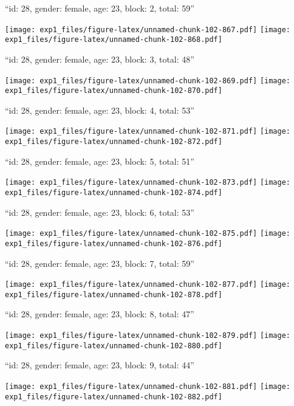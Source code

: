 \documentclass[11pt,,]{article}
\begin{document}
\newpage
[1] 

``id: 28, gender: female, age: 23, block: 2, total: 59''

\texttt{[image: exp1\_files/figure-latex/unnamed-chunk-102-867.pdf]}
\texttt{[image: exp1\_files/figure-latex/unnamed-chunk-102-868.pdf]}

\newpage
[1] 

``id: 28, gender: female, age: 23, block: 3, total: 48''

\texttt{[image: exp1\_files/figure-latex/unnamed-chunk-102-869.pdf]}
\texttt{[image: exp1\_files/figure-latex/unnamed-chunk-102-870.pdf]}

\newpage
[1] 

``id: 28, gender: female, age: 23, block: 4, total: 53''

\texttt{[image: exp1\_files/figure-latex/unnamed-chunk-102-871.pdf]}
\texttt{[image: exp1\_files/figure-latex/unnamed-chunk-102-872.pdf]}

\newpage
[1] 

``id: 28, gender: female, age: 23, block: 5, total: 51''

\texttt{[image: exp1\_files/figure-latex/unnamed-chunk-102-873.pdf]}
\texttt{[image: exp1\_files/figure-latex/unnamed-chunk-102-874.pdf]}

\newpage
[1] 

``id: 28, gender: female, age: 23, block: 6, total: 53''

\texttt{[image: exp1\_files/figure-latex/unnamed-chunk-102-875.pdf]}
\texttt{[image: exp1\_files/figure-latex/unnamed-chunk-102-876.pdf]}

\newpage
[1] 

``id: 28, gender: female, age: 23, block: 7, total: 59''

\texttt{[image: exp1\_files/figure-latex/unnamed-chunk-102-877.pdf]}
\texttt{[image: exp1\_files/figure-latex/unnamed-chunk-102-878.pdf]}

\newpage
[1] 

``id: 28, gender: female, age: 23, block: 8, total: 47''

\texttt{[image: exp1\_files/figure-latex/unnamed-chunk-102-879.pdf]}
\texttt{[image: exp1\_files/figure-latex/unnamed-chunk-102-880.pdf]}

\newpage
[1] 

``id: 28, gender: female, age: 23, block: 9, total: 44''

\texttt{[image: exp1\_files/figure-latex/unnamed-chunk-102-881.pdf]}
\texttt{[image: exp1\_files/figure-latex/unnamed-chunk-102-882.pdf]}
\end{document}
